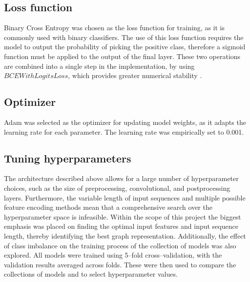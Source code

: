 \subsection{Loss function}
Binary Cross Entropy was chosen as the loss function for training, as it is commonly used with binary classifiers. 
The use of this loss function requires the model to output the probability of picking the positive class, therefore a sigmoid function must be applied to the output of the final layer.
These two operations are combined into a single step in the implementation, by using  $BCEWithLogitsLoss$, which provides greater numerical stability \cite{Ansel_PyTorch_2_Faster_2024}.

\subsection{Optimizer}
Adam was selected as the optimizer for updating model weights, as it adapts the learning rate for each parameter. The learning rate was empirically set to 0.001.

\subsection{Tuning hyperparameters}
The architecture described above allows for a large number of hyperparameter choices, such as the size of preprocessing, convolutional, and postprocessing layers. Furthermore, the variable length of input sequences and multiple possible feature encoding methods mean that a comprehensive search over the hyperparameter space is infeasible. Within the scope of this project the biggest emphasis was placed on finding the optimal input features and input sequence length, thereby identifying the best graph representation. Additionally, the effect of class imbalance on the training process of the collection of models was also explored.
All models were trained using 5--fold cross--validation, with the validation results averaged across folds. These were then used to compare the collections of models and to select hyperparameter values.